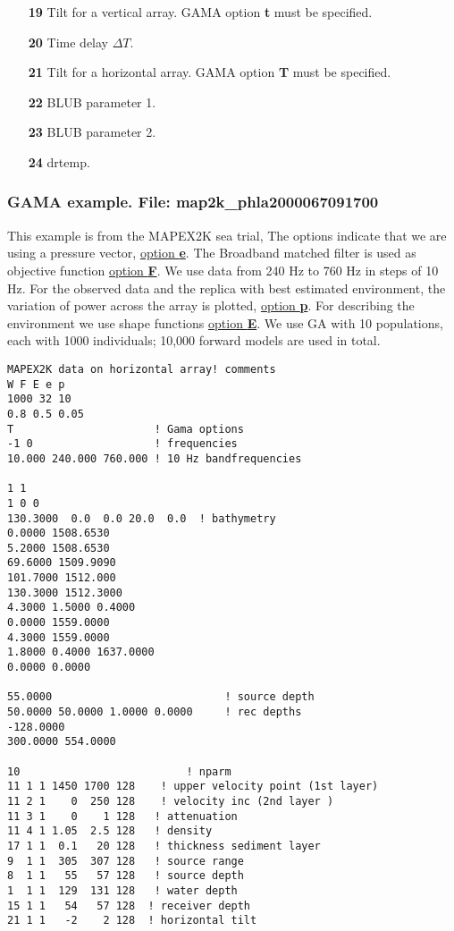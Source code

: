 \documentclass{saclantc}
\begin{document}
\begin{itemize}
               {\tt index} refers to the actual point.
\vspace{-0.3cm}
    \item[\bf 19] Tilt for a vertical array. {\sf GAMA} option {\bf t} must be specified.
\vspace{-0.3cm}
    \item[\bf 20] Time delay $\Delta T$. 
\vspace{-0.3cm}
    \item[\bf 21] Tilt for a horizontal array. {\sf GAMA} option {\bf T} must be specified.
\vspace{-0.3cm}
    \item[\bf 22] BLUB parameter 1.
\vspace{-0.3cm}
    \item[\bf 23] BLUB parameter 2.
\vspace{-0.3cm}
    \item[\bf 24] drtemp.
\end{itemize}

\subsubsection{GAMA example. File: {\bf map2k\_phla2000067091700}}

\label{se:map2k} 
This example is from the MAPEX2K sea trial,
The options indicate that we are using a pressure vector, 
\underline{option {\bf e}}. 
The Broadband matched filter is used as objective function
\underline{option {\bf F}}.  
We use data from 240 Hz to 760 Hz in steps of  10 Hz.
For the observed data and the replica with best estimated environment,
the variation of power across the array is plotted, \underline{option {\bf p}}.
For describing the environment we use shape functions \underline{option {\bf E}}.
We use GA with 10 populations,
each with 1000 individuals; 10,000 forward models are used in total.

\small
\begin{verbatim}
MAPEX2K data on horizontal array! comments
W F E e p
1000 32 10
0.8 0.5 0.05
T                      ! Gama options
-1 0                   ! frequencies
10.000 240.000 760.000 ! 10 Hz bandfrequencies

1 1
1 0 0
130.3000  0.0  0.0 20.0  0.0  ! bathymetry
0.0000 1508.6530
5.2000 1508.6530
69.6000 1509.9090
101.7000 1512.000
130.3000 1512.3000
4.3000 1.5000 0.4000
0.0000 1559.0000
4.3000 1559.0000
1.8000 0.4000 1637.0000
0.0000 0.0000

55.0000                           ! source depth
50.0000 50.0000 1.0000 0.0000     ! rec depths
-128.0000
300.0000 554.0000

10                          ! nparm 
11 1 1 1450 1700 128    ! upper velocity point (1st layer)
11 2 1    0  250 128    ! velocity inc (2nd layer )
11 3 1    0    1 128   ! attenuation
11 4 1 1.05  2.5 128   ! density
17 1 1  0.1   20 128   ! thickness sediment layer 
9  1 1  305  307 128   ! source range  
8  1 1   55   57 128   ! source depth     
1  1 1  129  131 128   ! water depth
15 1 1   54   57 128  ! receiver depth
21 1 1   -2    2 128  ! horizontal tilt
\end{verbatim}
\normalsize
\end{document}
